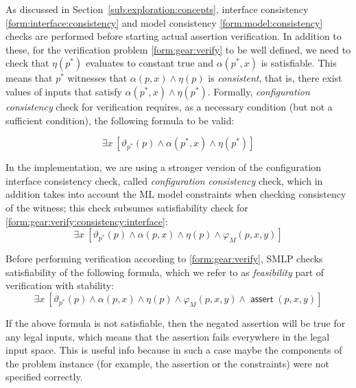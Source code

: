 \documentclass[a4paper,parskip=half]{article} %
\newcommand*\assert{\operatorname{\mathsf{assert}}}
\begin{document}
As discussed in Section~\ref{sub:exploration:concepts}, interface consistency \cref{form:interface:consistency} and
model consistency \cref{form:model:consistency} 
checks are performed before starting actual assertion verification. In addition to these,
for the verification problem \cref{form:gear:verify} to be well defined, we need to check that $\eta(p^*)$ evaluates to constant true 
and  $\alpha(p^*,x)$ is satisfiable. This means that $p^*$ witnesses that $\alpha(p,x) \wedge \eta(p)$ is \emph{consistent}, 
that is, there exist values of inputs that satisfy  $\alpha(p^*,x) \wedge \eta(p^*)$.  Formally, \emph{configuration consistency} 
check for verification requires, as a necessary condition (but not a sufficient condition), the following formula to be valid: 

\begin{equation}\label{form:gear:verify:consistency:interface}
\exists x~ [\vartheta_{p^*}(p) \wedge \alpha(p^*, x) \wedge \eta(p^*)]
\end{equation}


In the implementation, we are using a stronger version of the configuration interface consistency check, 
called \emph{configuration consistency} check, which in 
addition takes into account the ML model constraints when checking consistency of the witness;
this check subsumes satisfiability check for \cref{form:gear:verify:consistency:interface}:
\begin{equation}\label{form:verify:witness:model:consistency}
\exists x~ [\vartheta_{p^*}(p) \wedge \alpha(p, x) \wedge \eta(p)  \wedge \varphi_M(p,x,y)]
\end{equation}


Before performing verification according to \cref{form:gear:verify}, SMLP checks satisfiability 
of the following formula, which we refer to as \emph{feasibility} part of verification with stability:
\begin{equation}\label{form:gear:verify:feasibility}
\exists x~ [\vartheta_{p^*}(p) \wedge \alpha(p, x) \wedge \eta(p)  \wedge \varphi_M(p,x,y) \wedge  \assert(p,x,y)]
\end{equation}

\noindent If the above formula is not satisfiable, then the negated assertion will be true for any legal inputs, which means that the assertion 
fails everywhere in the legal input space. This is useful info because in such a case maybe the components of the problem instance 
(for example, the assertion or the constraints) were not specified correctly.
\end{document}
